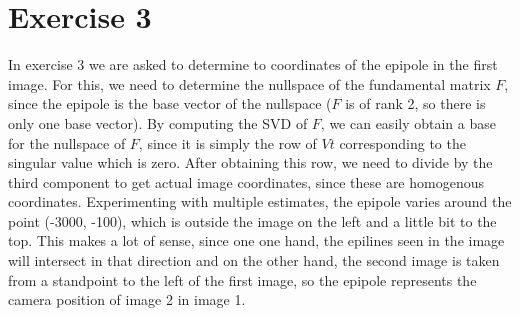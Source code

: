 \documentclass[11pt,a4paper]{article}
\begin{document}
\section{Exercise 3}
In exercise 3 we are asked to determine to coordinates of the epipole in the first image. For this, we need to determine the nullspace of the fundamental matrix $F$, since the epipole is the base vector of the nullspace ($F$ is of rank 2, so there is only one base vector). By computing the SVD of $F$, we can easily obtain a base for the nullspace of $F$, since it is simply the row of $Vt$ corresponding to the singular value which is zero. After obtaining this row, we need to divide by the third component to get actual image coordinates, since these are homogenous coordinates. Experimenting with multiple estimates, the epipole varies around the point (-3000, -100), which is outside the image on the left and a little bit to the top. This makes a lot of sense, since one one hand, the epilines seen in the image will intersect in that direction and on the other hand, the second image is taken from a standpoint to the left of the first image, so the epipole represents the camera position of image 2 in image 1.
\end{document}
